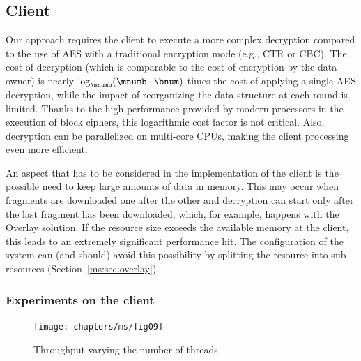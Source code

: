 \subsection{Client}\label{ms:sec:client}
Our approach requires the client to execute a more complex decryption compared to the use of AES with a traditional encryption mode (e.g., CTR or CBC). The cost of decryption (which is comparable to the cost of encryption by the data owner) is nearly $\log_{\mnumb} (\mnumb \cdot \bnum)$ times the cost of applying a single AES decryption, while the impact of reorganizing the data structure at each round is limited. Thanks to the high performance provided by modern processors in the execution of block ciphers, this logarithmic cost factor is not critical. Also, decryption can be parallelized on multi-core CPUs, making the client processing even more efficient.

An aspect that has to be considered in the implementation of the client is the possible need to keep large amounts of data in memory. This may occur when fragments are downloaded one after the other and decryption can start only after the last fragment has been downloaded, which, for example, happens with the Overlay solution. If the resource size exceeds the available memory at the client, this leads to an extremely significant performance hit. The configuration of the system can (and should) avoid this possibility by splitting the resource into sub-resources (Section~\ref{ms:sec:overlay}).

\subsubsection{Experiments on the client}

\begin{figure}
\texttt{[image: chapters/ms/fig09]}
\caption{\label{ms:fig:clientPerf}Throughput varying the number of threads}
\end{figure}

